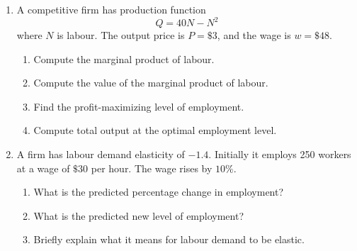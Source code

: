 \documentclass[12pt]{article}
\begin{document}
\begin{enumerate}
\begin{enumerate}[label=(\alph*)]
    \item Under Program A, write the budget line equation.
    \item Under Program B, write disposable income while benefits are positive.
    \item Under Program B, what is the effective net wage?
    \item Which program creates a substitution effect? Explain.
    \item Which program is more likely to reduce hours worked? Explain carefully.
\end{enumerate}

\section*{Part III: Labour Demand in Competitive Markets}

\item A competitive firm has production function
\[
Q = 40N - N^2
\]
where \(N\) is labour. The output price is \(P=\$3\), and the wage is \(w=\$48\).

\begin{enumerate}[label=(\alph*)]
    \item Compute the marginal product of labour.
    \item Compute the value of the marginal product of labour.
    \item Find the profit-maximizing level of employment.
    \item Compute total output at the optimal employment level.
\end{enumerate}

\item A firm has labour demand elasticity of \(-1.4\). Initially it employs 250 workers at a wage of \(\$30\) per hour. The wage rises by \(10\%\).

\begin{enumerate}[label=(\alph*)]
    \item What is the predicted percentage change in employment?
    \item What is the predicted new level of employment?
    \item Briefly explain what it means for labour demand to be elastic.
\end{enumerate}


\end{enumerate}
\end{document}
